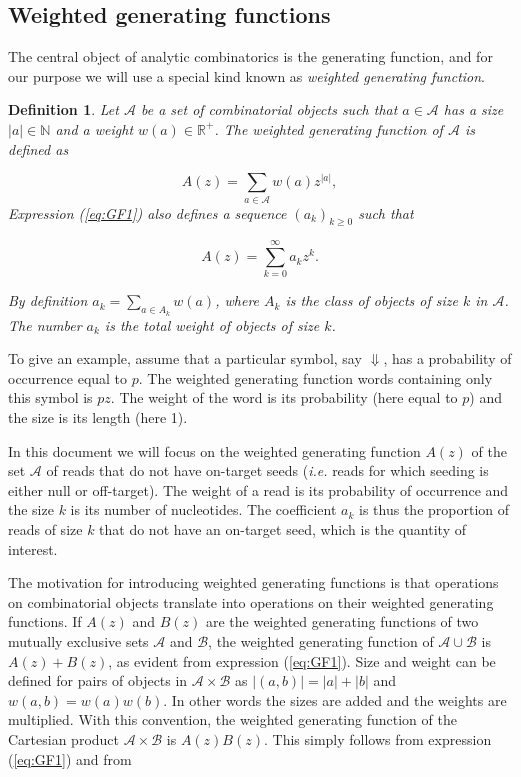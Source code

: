 \documentclass{article}
\newtheorem{definition}{Definition}
\begin{document}
\subsection{Weighted generating functions}

The central object of analytic combinatorics is the generating function,
and for our purpose we will use a special kind known as \emph{weighted
generating function}.

\begin{definition}
\label{def:GF}
Let $\mathcal{A}$ be a set of combinatorial objects such that $a \in
\mathcal{A}$ has a size $|a| \in \mathbb{N}$ and a weight $w(a) \in
\mathbb{R}^+$. The weighted generating function of $\mathcal{A}$ is
defined as

\begin{equation}
\label{eq:GF1}
A(z) = \sum_{a \in \mathcal{A}} w(a) z^{|a|},
\end{equation}
Expression (\ref{eq:GF1}) also defines a sequence $(a_k)_{k \geq 0}$ such
that 

\begin{equation*}
A(z) = \sum_{k=0}^\infty a_k z^k.
\end{equation*}

By definition $a_k = \sum_{a \in A_k}w(a)$, where $A_k$ is the class of
objects of size $k$ in $\mathcal{A}$. The number $a_k$ is the
total weight of objects of size $k$.
\end{definition}

To give an example, assume that a particular symbol, say $\Downarrow$, has
a probability of occurrence equal to $p$. The weighted generating function
words containing only this symbol is $pz$. The weight of the word is its
probability (here equal to $p$) and the size is its length (here 1).

In this document we will focus on the weighted generating function $A(z)$
of the set $\mathcal{A}$ of reads that do not have on-target seeds
(\textit{i.e.} reads for which seeding is either null or off-target). The
weight of a read is its probability of occurrence and the size $k$ is its
number of nucleotides. The coefficient $a_k$ is thus the proportion of
reads of size $k$ that do not have an on-target seed, which is the
quantity of interest.

The motivation for introducing weighted generating functions is that
operations on combinatorial objects translate into operations on their
weighted generating functions. If $A(z)$ and $B(z)$ are the weighted
generating functions of two mutually exclusive sets $\mathcal{A}$ and
$\mathcal{B}$, the weighted generating function of $\mathcal{A} \cup
\mathcal{B}$ is $A(z) + B(z)$, as evident from expression (\ref{eq:GF1}).
Size and weight can be defined for pairs of objects in $\mathcal{A} \times
\mathcal{B}$ as $|(a,b)| = |a| + |b|$ and $w(a,b) = w(a)w(b)$. In other
words the sizes are added and the weights are multiplied.  With this
convention, the weighted generating function of the Cartesian product
$\mathcal{A} \times \mathcal{B}$ is $A(z)B(z)$. This simply follows from
expression (\ref{eq:GF1}) and from
\end{document}
